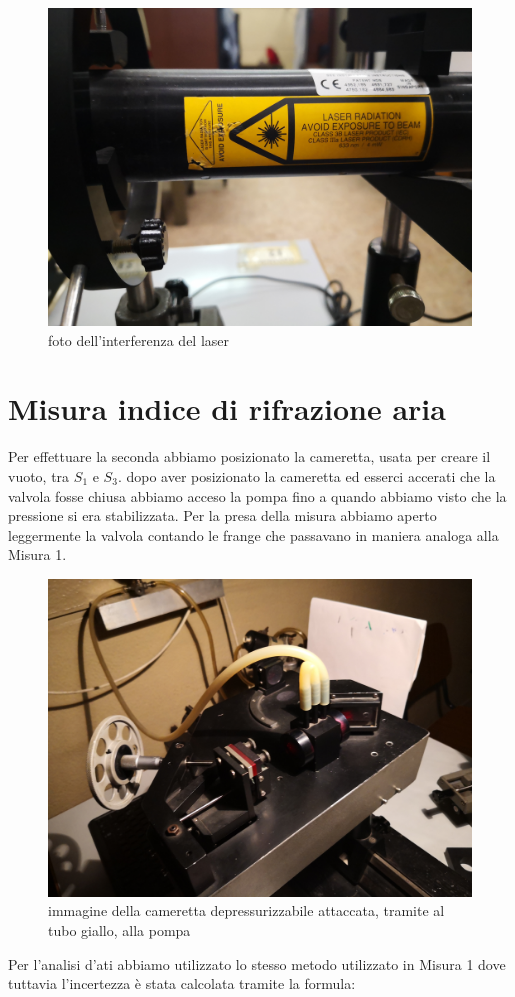 \documentclass{article}
\begin{document}
\begin{figure}[h!]
  \centering
  \includegraphics[width=0.6\linewidth]{IM etichetta laser}
  \caption{foto dell'interferenza del laser}
\end{figure}

\pagebreak
\section{Misura indice di rifrazione aria}
Per effettuare la seconda abbiamo posizionato la cameretta, usata per creare il vuoto, tra $S_1$ e $S_3$. dopo aver posizionato la cameretta ed esserci accerati che la valvola fosse chiusa abbiamo acceso la pompa fino a quando abbiamo visto che la pressione si era stabilizzata. Per la presa della misura abbiamo aperto leggermente la valvola contando le frange che passavano in maniera analoga alla Misura 1.

\begin{figure}[h!]
  \centering
  \includegraphics[width=0.6\linewidth]{IM cameretta}
  \caption{immagine della cameretta depressurizzabile attaccata, tramite al tubo giallo, alla pompa}
\end{figure}

\pagebreak
Per l'analisi d'ati abbiamo utilizzato lo stesso metodo utilizzato in Misura 1 dove tuttavia l'incertezza è stata calcolata tramite la formula:
\end{document}
